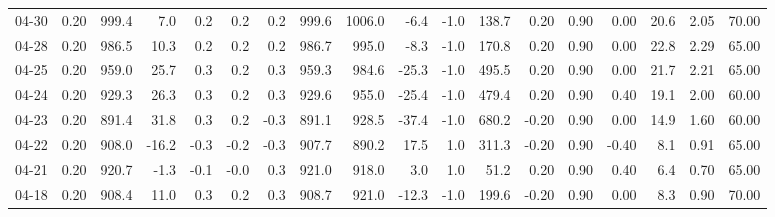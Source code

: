 \begin{threeparttable}
{\begin{tabular}{lrrrrrrrrrrrrrrrrr}
  04-30 &     0.20 &  999.4 &               7.0 &               0.2 &                0.2 &                0.2 &  999.6 & 1006.0 &       -6.4 &                     -1.0 &               138.7 &       0.20 &      0.90 &           0.00 &             20.6 &            2.05 &                  70.00 \\
  04-28 &     0.20 &  986.5 &              10.3 &               0.2 &                0.2 &                0.2 &  986.7 &  995.0 &       -8.3 &                     -1.0 &               170.8 &       0.20 &      0.90 &           0.00 &             22.8 &            2.29 &                  65.00 \\
  04-25 &     0.20 &  959.0 &              25.7 &               0.3 &                0.2 &                0.3 &  959.3 &  984.6 &      -25.3 &                     -1.0 &               495.5 &       0.20 &      0.90 &           0.00 &             21.7 &            2.21 &                  65.00 \\
  04-24 &     0.20 &  929.3 &              26.3 &               0.3 &                0.2 &                0.3 &  929.6 &  955.0 &      -25.4 &                     -1.0 &               479.4 &       0.20 &      0.90 &           0.40 &             19.1 &            2.00 &                  60.00 \\
  04-23 &     0.20 &  891.4 &              31.8 &               0.3 &                0.2 &               -0.3 &  891.1 &  928.5 &      -37.4 &                     -1.0 &               680.2 &      -0.20 &      0.90 &           0.00 &             14.9 &            1.60 &                  60.00 \\
  04-22 &     0.20 &  908.0 &             -16.2 &              -0.3 &               -0.2 &               -0.3 &  907.7 &  890.2 &       17.5 &                      1.0 &               311.3 &      -0.20 &      0.90 &          -0.40 &              8.1 &            0.91 &                  65.00 \\
  04-21 &     0.20 &  920.7 &              -1.3 &              -0.1 &               -0.0 &                0.3 &  921.0 &  918.0 &        3.0 &                      1.0 &                51.2 &       0.20 &      0.90 &           0.40 &              6.4 &            0.70 &                  65.00 \\
  04-18 &     0.20 &  908.4 &              11.0 &               0.3 &                0.2 &                0.3 &  908.7 &  921.0 &      -12.3 &                     -1.0 &               199.6 &      -0.20 &      0.90 &           0.00 &              8.3 &            0.90 &                  70.00 \\

\end{tabular}}
\end{threeparttable}
